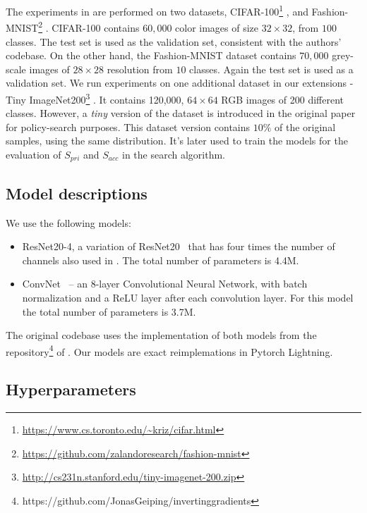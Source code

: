 The experiments in \cite{gao2021privacy} are performed on two datasets, CIFAR-100\footnote{\url{https://www.cs.toronto.edu/~kriz/cifar.html}} \cite{krizhevsky2009learning}, and Fashion-MNIST\footnote{\url{https://github.com/zalandoresearch/fashion-mnist}} \cite{xiao2017fashionmnist}. CIFAR-100 contains $60,000$ color images of size $32\times32$, from $100$ classes. The test set is used as the validation set, consistent with the authors' codebase.
On the other hand, the Fashion-MNIST dataset contains $70,000$  grey-scale images of $28\times28$ resolution from $10$ classes. Again the test set is used as a validation set. We run experiments on one additional dataset in our extensions - Tiny ImageNet200\footnote{\url{http://cs231n.stanford.edu/tiny-imagenet-200.zip}} \cite{imagenet_cvpr09}. It contains 120,000, $64\times64$ RGB images of 200 different classes. However, a \emph{tiny} version of the dataset is introduced in the original paper for policy-search purposes. This dataset version contains $10\%$ of the original samples, using the same distribution. It's later used to train the models for the evaluation of $S_{pri}$ and $S_{acc}$ in the search algorithm.

\subsection{Model descriptions}

We use the following models:

\begin{itemize}[noitemsep]
    \item ResNet20-4, a variation of ResNet20~\cite{he2016deep} that has four times the number of channels also used in \cite{geiping2020inverting}. The total number of parameters is 4.4M.
    \item ConvNet~\cite{geiping2020inverting} -- an 8-layer Convolutional Neural Network, with batch normalization and a ReLU layer after each convolution layer. For this model the total number of parameters is 3.7M.
\end{itemize}

The original codebase uses the implementation of both models from the repository\footnote{https://github.com/JonasGeiping/invertinggradients} of \cite{geiping2020inverting}. Our models are exact reimplemations in Pytorch Lightning.

\subsection{Hyperparameters}

